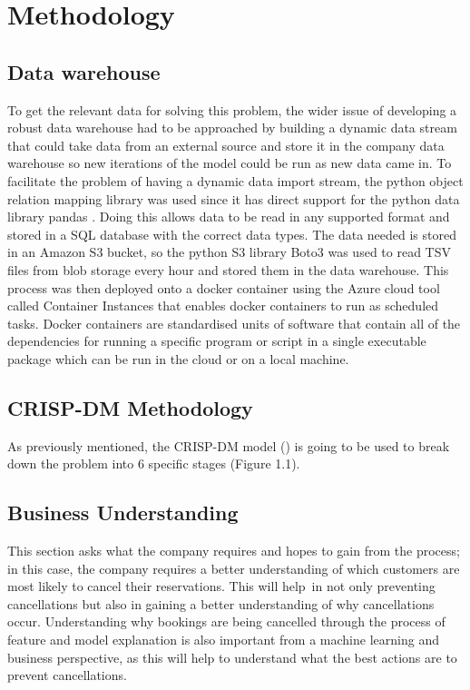 \chapter{Methodology}
\label{ch:method}

\section{Data warehouse}
To get the relevant data for solving this problem, the wider issue of developing a robust data warehouse had to be approached by building a dynamic data stream that could take data from an external source and store it in the company data warehouse so new iterations of the model could be run as new data came in. To facilitate the problem of having a dynamic data import stream, the python object relation mapping library was used since it has direct support for the python data library pandas . Doing this allows data to be read in any supported format and stored in a SQL database with the correct data types. The data needed is stored in an Amazon S3 bucket, so the python S3 library Boto3 was used to read TSV files from blob storage every hour and stored them in the data warehouse. This process was then deployed onto a docker container using the Azure cloud tool called Container Instances that enables docker containers to run as scheduled tasks. Docker containers are standardised units of software that contain all of the dependencies for running a specific program or script in a single executable package which can be run in the cloud or on a local machine.

\section{CRISP-DM Methodology}

As previously mentioned, the CRISP-DM model (\cite{Wirth2000CRISP-DMMining}) is going to be used to break down the problem into 6 specific stages (Figure 1.1). 

\section{Business Understanding}

This section asks what the company requires and hopes to gain from the process; in this case, the company requires a better understanding of which customers are most likely to cancel their reservations. This will help in not only preventing cancellations but also in gaining a better understanding of why cancellations occur. Understanding why bookings are being cancelled through the process of feature and model explanation is also important from a machine learning and business perspective, as this will help to understand what the best actions are to prevent cancellations.

